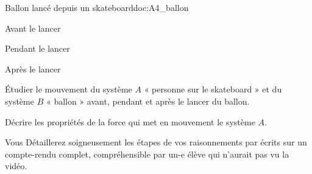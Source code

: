 \begin{doc}{Ballon lancé depuis un skateboard}{doc:A4_ballon}
  \begin{flushright}
    \vspace*{-18pt}
  \end{flushright}
  \begin{multicols}{3}
    \centering
    
    Avant le lancer
    

    Pendant le lancer
    

    Après le lancer
  \end{multicols}
\end{doc}



\numeroQuestion
Étudier le mouvement du système $A$ « personne sur le skateboard » et du système $B$ « ballon » avant, pendant et après le lancer du ballon.

\numeroQuestion
Décrire les propriétés de la force qui met en mouvement le système $A$.

\fleche Vous Détaillerez soigneusement les étapes de vos raisonnements par écrits sur un compte-rendu complet, compréhensible par un-e élève qui n'aurait pas vu la vidéo.

